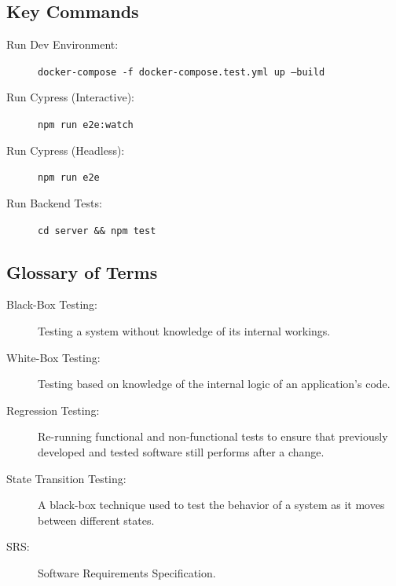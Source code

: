 \documentclass{article}
\begin{document}
\subsection{Key Commands}
\begin{description}
    \item[Run Dev Environment:] \texttt{docker-compose -f docker-compose.test.yml up --build}
    \item[Run Cypress (Interactive):] \texttt{npm run e2e:watch}
    \item[Run Cypress (Headless):] \texttt{npm run e2e}
    \item[Run Backend Tests:] \texttt{cd server \&\& npm test}
\end{description}

\subsection{Glossary of Terms}
\begin{description}
    \item[Black-Box Testing:] Testing a system without knowledge of its internal workings.
    \item[White-Box Testing:] Testing based on knowledge of the internal logic of an application's code.
    \item[Regression Testing:] Re-running functional and non-functional tests to ensure that previously developed and tested software still performs after a change.
    \item[State Transition Testing:] A black-box technique used to test the behavior of a system as it moves between different states.
    \item[SRS:] Software Requirements Specification.
\end{description}
\end{document}
